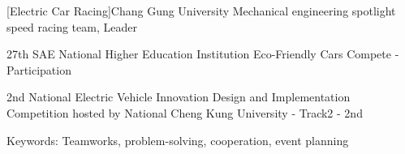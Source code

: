 \begin{cventries}

  
  \cventry
    {} %
    {[Electric Car Racing]Chang Gung University Mechanical engineering spotlight speed racing team, Leader} %
    {} %
    {} %
    {
      \begin{cvitems} %
      	\item {27th SAE National Higher Education Institution Eco-Friendly Cars Compete - Participation}
      	\item {2nd National Electric Vehicle Innovation Design and Implementation Competition hosted by National Cheng Kung University - Track2 - 2nd}
      	\item {Keywords: Teamworks, problem-solving, cooperation, event planning}
      \end{cvitems}
    } 

\end{cventries}